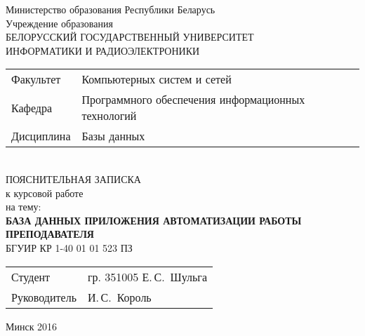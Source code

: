 \begin{titlepage}
  \begin{center}
    Министерство образования Республики Беларусь\\[1em]
    Учреждение образования\\
    БЕЛОРУССКИЙ ГОСУДАРСТВЕННЫЙ УНИВЕРСИТЕТ \\
    ИНФОРМАТИКИ И РАДИОЭЛЕКТРОНИКИ\\[1em]

    \begin{minipage}{\textwidth}
      \begin{flushleft}
        \begin{tabular}{ l l }
          Факультет  & Компьютерных систем и сетей\\
          Кафедра    & Программного обеспечения информационных технологий\\
          Дисциплина & Базы данных
        \end{tabular}
      \end{flushleft}
    \end{minipage}\\[6em]

    {ПОЯСНИТЕЛЬНАЯ ЗАПИСКА}\\
    {к курсовой работе}\\
    {на тему:}\\[1em]
    \textbf{\large БАЗА ДАННЫХ ПРИЛОЖЕНИЯ АВТОМАТИЗАЦИИ РАБОТЫ ПРЕПОДАВАТЕЛЯ}\\[1em]


    {БГУИР КР 1-40 01 01 523 ПЗ}\\[17em]
    
    \begin{tabular}{ p{}p{} }
      Студент & гр. 351005 Е.\,С.~Шульга \\
      Руководитель & И.\,С.~Король \\
    \end{tabular}
    
    \vfill
    {\normalsize Минск 2016}
  \end{center}
\end{titlepage}
